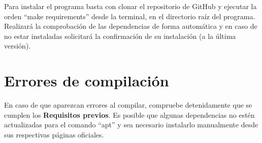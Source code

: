 Para instalar el programa basta con clonar el repositorio de GitHub y ejecutar la orden ``make requirements'' desde la terminal, en el directorio raíz del programa. Realizará la comprobación de las dependencias de forma automática y en caso de no estar instaladas solicitará la confirmación de su instalación (a la última versión).\\

\section{Errores de compilación}

En caso de que aparezcan errores al compilar, compruebe detenidamente que se cumplen los \textbf{Requisitos previos}. Es posible que algunas dependencias no estén actualizadas para el comando ``apt'' y sea necesario instalarlo manualmente desde sus respectivas páginas oficiales.

\endinput
